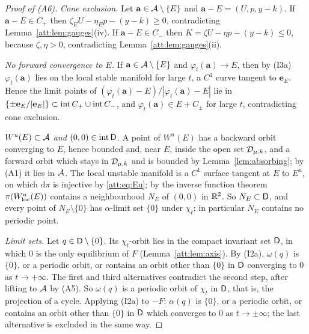 \begin{proof}[Proof of (A6)]
\emph{Cone exclusion.} Let $\mathbf a\in\mathcal A\setminus\{E\}$ and $\mathbf a-E=(U,p,y-k)$. If $\mathbf a-E\in C_+$ then $\zeta_EU-\eta_Ep-(y-k)\ge0$, contradicting Lemma~\ref{att:lem:gauges}(iv). If $\mathbf a-E\in C_-$ then $K=\zeta U-\eta p-(y-k)\le0$, because $\zeta,\eta>0$, contradicting Lemma~\ref{att:lem:gauges}(ii).

\emph{No forward convergence to $E$.} If $\mathbf a\in\mathcal A\setminus\{E\}$ and $\varphi_t(\mathbf a)\to E$, then by (I3a) $\varphi_t(\mathbf a)$ lies on the local stable manifold for large $t$, a $C^1$ curve tangent to $\mathbf e_E$. Hence the limit points of $(\varphi_t(\mathbf a)-E)/|\varphi_t(\mathbf a)-E|$ lie in $\{\pm\mathbf e_E/|\mathbf e_E|\}\subset\operatorname{int} C_+\cup\operatorname{int} C_-$, and $\varphi_t(\mathbf a)\in E+C_\pm$ for large $t$, contradicting cone exclusion.

\emph{$W^u(E)\subset\mathcal A$ and $(0,0)\in\operatorname{int}\mathsf D$.} A point of $W^u(E)$ has a backward orbit converging to $E$, hence bounded and, near $E$, inside the open set $\mathcal D_{\mu,k}$, and a forward orbit which stays in $\mathcal D_{\mu,k}$ and is bounded by Lemma~\ref{lem:absorbing}; by (A1) it lies in $\mathcal A$. The local unstable manifold is a $C^1$ surface tangent at $E$ to $E^u$, on which $\mathrm d\pi$ is injective by \eqref{att:eq:Eu}; by the inverse function theorem $\pi(W^u_{\rm loc}(E))$ contains a neighbourhood $N_E$ of $(0,0)$ in $\mathbb R^2$. So $N_E\subset\mathsf D$, and every point of $N_E\setminus\{0\}$ has $\alpha$-limit set $\{0\}$ under $\chi_t$; in particular $N_E$ contains no periodic point.

\emph{Limit sets.} Let $q\in\mathsf D\setminus\{0\}$. Its $\chi_t$-orbit lies in the compact invariant set $\mathsf D$, in which $0$ is the only equilibrium of $F$ (Lemma~\ref{att:lem:axis}). By (I2a), $\omega(q)$ is $\{0\}$, or a periodic orbit, or contains an orbit other than $\{0\}$ in $\mathsf D$ converging to $0$ as $t\to+\infty$. The first and third alternatives contradict the second step, after lifting to $\mathcal A$ by (A5). So $\omega(q)$ is a periodic orbit of $\chi_t$ in $\mathsf D$, that is, the projection of a cycle. Applying (I2a) to $-F$: $\alpha(q)$ is $\{0\}$, or a periodic orbit, or contains an orbit other than $\{0\}$ in $\mathsf D$ which converges to $0$ as $t\to\pm\infty$; the last alternative is excluded in the same way.


\end{proof}
